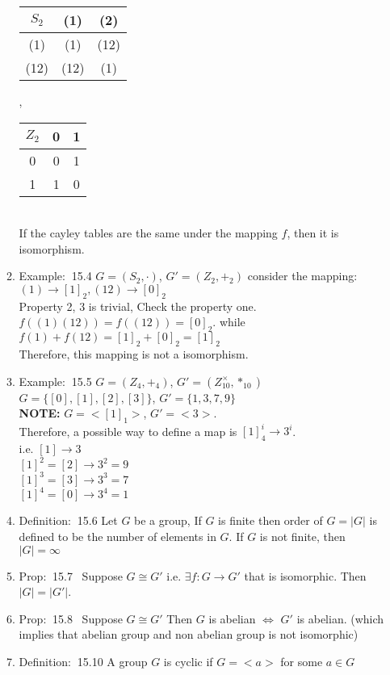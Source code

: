 \documentclass[12pt]{article}
\newcommand{\defi}{{\color{blue} Definition: $\ $}}
\newcommand{\exe}{{\color{green} Example: $\ $}}
\newcommand{\prop}{{\color{blue} Prop: $\ $}}
\begin{document}
\begin{enumerate}
\begin{enumerate}
        \begin{tabular}{c|cc}
            $S_2$ & (1) & (2)\\ \hline
            (1) & (1) & (12)\\
            (12) & (12) & (1)
        \end{tabular}, 
        \begin{tabular}{c|cc}
            $Z_2$ & 0 & 1\\ \hline
            0 & 0 & 1\\
            1 & 1 & 0
        \end{tabular}\\
        If the cayley tables are the same under the mapping $f$, then it is isomorphism.
        \item \exe 15.4 $G= (S_2, \cdot)$, $G'= (Z_2, +_2)$ consider the mapping: $(1) \rightarrow [1]_2, (12)\rightarrow [0]_2$\\
        Property 2, 3 is trivial, Check the property one.\\
        $f((1)(12)) = f((12)) = [0]_2$. while $f(1)+f(12) = [1]_2+ [0]_2 = [1]_2$\\
        Therefore, this mapping is not a isomorphism.
        \item \exe 15.5 $G= (Z_4, +_4)$, $G'= (Z^{\times}_10, *_10)$\\
        $G = \{[0], [1], [2], [3]\}$, $G'=\{1,3,7,9\}$\\
        \textbf{NOTE:} $G = <[1]_1>$, $G' = <3>$. \\
        Therefore, a possible way to define a map is $[1]_4^i \rightarrow 3^i$.\\
        i.e. $[1] \rightarrow 3$ \\
        $[1]^2 = [2]\rightarrow 3^2 = 9$ \\
        $[1]^3=[3] \rightarrow 3^3 = 7$ \\
        $[1]^4 = [0]\rightarrow 3^4 = 1 $
        \item \defi 15.6 Let $G$ be a group, If $G$ is finite then order of $G = |G|$ is defined to be the number of elements in $G$. If $G$ is not finite, then $|G| = \infty$ 
        \item \prop 15.7 \ Suppose $G\cong  G'$ i.e. $ \exists f:G\rightarrow G'$ that is isomorphic. Then $|G| = |G'|$.
        \item \prop 15.8 \ Suppose $G\cong  G'$ Then $G$ is abelian $\Leftrightarrow$ $G'$ is abelian. (which implies that abelian group and non abelian group is not isomorphic)
        \item \defi 15.10 A group $G$ is cyclic if $G = <a>$ for some $a \in G$

\end{enumerate}
\end{enumerate}
\end{document}
